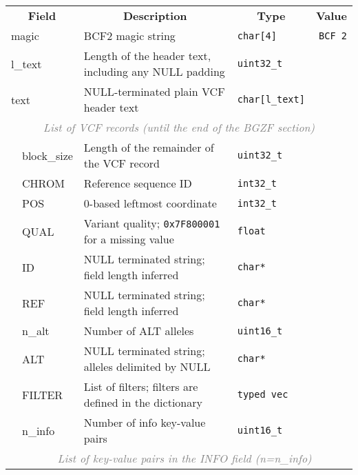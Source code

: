 \documentclass[10pt]{article}
\begin{document}
\begin{table}[ht]
\centering
{\small
\begin{tabular}{|l|l|l|p{8.2cm}|l|r|}
  \cline{1-6}
  \multicolumn{3}{|c|}{\bf Field} & \multicolumn{1}{c|}{\bf Description} & \multicolumn{1}{c|}{\bf Type} & \multicolumn{1}{c|}{\bf Value} \\\cline{1-6}
  \multicolumn{3}{|l|}{\sf magic} & BCF2 magic string & {\tt char[4]} & {\tt BCF\char92 2}\\\cline{1-6}
  \multicolumn{3}{|l|}{\sf l\_text} & Length of the header text, including any {\sf NULL} padding & {\tt uint32\_t} & \\\cline{1-6}
  \multicolumn{3}{|l|}{\sf text} & {\sf NULL}-terminated plain VCF header text & {\tt char[{\sf l\_text}]} & \\\cline{1-6}
  \multicolumn{6}{|c|}{\textcolor{gray}{\it List of VCF records (until the end of the BGZF section)}} \\\cline{2-6}
  & \multicolumn{2}{l|}{\sf block\_size} & Length of the remainder of the VCF record & {\tt uint32\_t} & \\\cline{2-6}
  & \multicolumn{2}{l|}{\sf CHROM} & Reference sequence ID & {\tt int32\_t} & \\\cline{2-6}
  & \multicolumn{2}{l|}{\sf POS} & 0-based leftmost coordinate & {\tt int32\_t} & \\\cline{2-6}
  & \multicolumn{2}{l|}{\sf QUAL} & Variant quality; {\tt 0x7F800001} for a missing value & {\tt float} & \\\cline{2-6}
  & \multicolumn{2}{l|}{\sf ID} & {\sf NULL} terminated string; field length inferred & {\tt char*} & \\\cline{2-6}
  & \multicolumn{2}{l|}{\sf REF} & {\sf NULL} terminated string; field length inferred & {\tt char*} & \\\cline{2-6}
  & \multicolumn{2}{l|}{\sf n\_alt} & Number of {\sf ALT} alleles & {\tt uint16\_t} & \\\cline{2-6}
  & \multicolumn{2}{l|}{\sf ALT} & {\sf NULL} terminated string; alleles delimited by {\sf NULL} & {\tt char*} & \\\cline{2-6}
  & \multicolumn{2}{l|}{\sf FILTER} & List of filters; filters are defined in the dictionary & {\tt typed vec} & \\\cline{2-6}
  & \multicolumn{2}{l|}{\sf n\_info} & Number of info key-value pairs & {\tt uint16\_t} & \\\cline{2-6}
  & \multicolumn{5}{c|}{\textcolor{gray}{\it List of key-value pairs in the INFO field (n=n\_info)}} \\\cline{3-6}

\end{tabular}}
\end{table}
\end{document}
